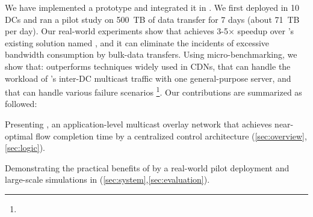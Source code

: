 We have implemented a prototype and integrated it in
\company. We first deployed
\name in 10 DCs and ran a pilot study on 500~TB of data transfer
for 7 days (about 71~TB per day).
Our real-world experiments show that \name achieves 3-5$\times$
speedup over \company's existing solution named \alg, and it can eliminate the
incidents of excessive bandwidth consumption by bulk-data transfers.
Using micro-benchmarking, we show
that: \name outperforms techniques widely used in CDNs, that \name
can handle the workload of \company's inter-DC multicast traffic with
one general-purpose server, and that \name can handle various
failure scenarios \footnote{}.
Our contributions are summarized as followed:
\begin{packeditemize}
\item {}
\item Presenting \name, an application-level multicast overlay
network that achieves near-optimal flow completion time by a
centralized control architecture
(\Section\ref{sec:overview},\ref{sec:logic}).
\item Demonstrating the practical benefits of \NEW{\name} by a real-world
pilot deployment and large-scale simulations in \company (\Section\ref{sec:system},\ref{sec:evaluation}).
\end{packeditemize}
